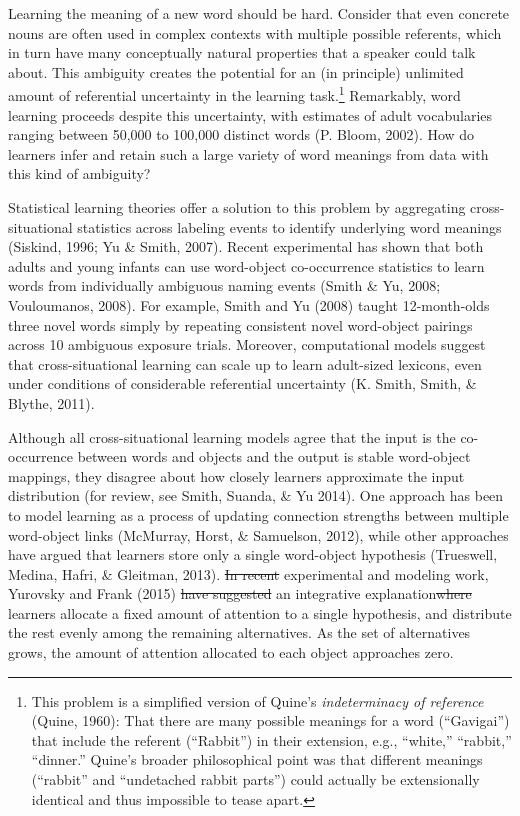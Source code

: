 \documentclass[authoryear, review]{elsarticle}
\providecommand{\DIFaddtex}[1]{{\protect\color{blue}\uwave{#1}}} %
\providecommand{\DIFdeltex}[1]{{\protect\color{red}\sout{#1}}}                      %
\providecommand{\DIFaddbegin}{} %
\providecommand{\DIFaddend}{} %
\providecommand{\DIFdelbegin}{} %
\providecommand{\DIFdelend}{} %
\providecommand{\DIFadd}[1]{\texorpdfstring{\DIFaddtex{#1}}{#1}} %
\providecommand{\DIFdel}[1]{\texorpdfstring{\DIFdeltex{#1}}{}} %
\begin{document}
Learning the meaning of a new word should be hard. Consider that even
concrete nouns are often used in complex contexts with multiple possible
referents, which in turn have many conceptually natural properties that
a speaker could talk about. This ambiguity creates the potential for an
(in principle) unlimited amount of referential uncertainty in the
learning task.\footnote{This problem is a simplified version of Quine's
  \textit{indeterminacy of reference} (Quine, 1960): That there are many
  possible meanings for a word (``Gavigai'') that include the referent
  (``Rabbit'') in their extension, e.g., ``white,'' ``rabbit,''
  ``dinner.'' Quine's broader philosophical point was that different
  meanings (``rabbit'' and ``undetached rabbit parts'') could actually
  be extensionally identical and thus impossible to tease apart.}
Remarkably, word learning proceeds despite this uncertainty, with
estimates of adult vocabularies ranging between 50,000 to 100,000
distinct words (P. Bloom, 2002). How do learners infer and retain such a
large variety of word meanings from data with this kind of ambiguity?

Statistical learning theories offer a solution to this problem by
aggregating cross-situational statistics across labeling events to
identify underlying word meanings (Siskind, 1996; Yu \& Smith, 2007).
Recent experimental \DIFaddbegin \DIFadd{work }\DIFaddend has shown that both adults and young infants
can use word-object co-occurrence statistics to learn words from
individually ambiguous naming events (Smith \& Yu, 2008; Vouloumanos,
2008). For example, Smith and Yu (2008) taught 12-month-olds three novel
words simply by repeating consistent novel word-object pairings across
10 ambiguous exposure trials. Moreover, computational models suggest
that cross-situational learning can scale up to learn adult-sized
lexicons, even under conditions of considerable referential uncertainty
(K. Smith, Smith, \& Blythe, 2011).

Although all cross-situational learning models agree that the input is
the co-occurrence between words and objects and the output is stable
word-object mappings, they disagree about how closely learners
approximate the input distribution (for review, see Smith, Suanda, \& Yu
2014). One approach has been to model learning as a process of updating
connection strengths between multiple word-object links (McMurray,
Horst, \& Samuelson, 2012), while other approaches have argued that
learners store only a single word-object hypothesis (Trueswell, Medina,
Hafri, \& Gleitman, 2013). \DIFdelbegin \DIFdel{In recent }\DIFdelend \DIFaddbegin \DIFadd{Recent }\DIFaddend experimental and modeling work,
Yurovsky and Frank (2015) \DIFdelbegin \DIFdel{have suggested }\DIFdelend \DIFaddbegin \DIFadd{suggests }\DIFaddend an integrative explanation\DIFdelbegin \DIFdel{where }\DIFdelend \DIFaddbegin \DIFadd{: }\DIFaddend learners
allocate a fixed amount of attention to a single hypothesis, and
distribute the rest evenly among the remaining alternatives. As the set
of alternatives grows, the amount of attention allocated to each object
approaches zero.
\end{document}
